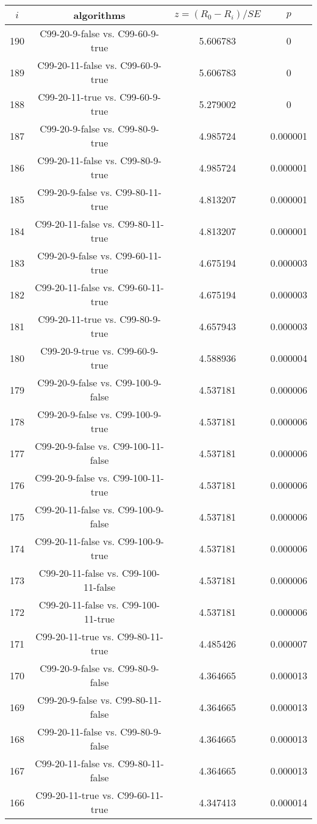 \documentclass[a4paper,10pt]{article}
\begin{document}
\begin{landscape}
\begin{table}[!htp]
\centering\scriptsize
\begin{tabular}{cccc}
$i$&algorithms&$z=(R_0 - R_i)/SE$&$p$\\
\hline190&C99-20-9-false vs. C99-60-9-true&5.606783&0\\
189&C99-20-11-false vs. C99-60-9-true&5.606783&0\\
188&C99-20-11-true vs. C99-60-9-true&5.279002&0\\
187&C99-20-9-false vs. C99-80-9-true&4.985724&0.000001\\
186&C99-20-11-false vs. C99-80-9-true&4.985724&0.000001\\
185&C99-20-9-false vs. C99-80-11-true&4.813207&0.000001\\
184&C99-20-11-false vs. C99-80-11-true&4.813207&0.000001\\
183&C99-20-9-false vs. C99-60-11-true&4.675194&0.000003\\
182&C99-20-11-false vs. C99-60-11-true&4.675194&0.000003\\
181&C99-20-11-true vs. C99-80-9-true&4.657943&0.000003\\
180&C99-20-9-true vs. C99-60-9-true&4.588936&0.000004\\
179&C99-20-9-false vs. C99-100-9-false&4.537181&0.000006\\
178&C99-20-9-false vs. C99-100-9-true&4.537181&0.000006\\
177&C99-20-9-false vs. C99-100-11-false&4.537181&0.000006\\
176&C99-20-9-false vs. C99-100-11-true&4.537181&0.000006\\
175&C99-20-11-false vs. C99-100-9-false&4.537181&0.000006\\
174&C99-20-11-false vs. C99-100-9-true&4.537181&0.000006\\
173&C99-20-11-false vs. C99-100-11-false&4.537181&0.000006\\
172&C99-20-11-false vs. C99-100-11-true&4.537181&0.000006\\
171&C99-20-11-true vs. C99-80-11-true&4.485426&0.000007\\
170&C99-20-9-false vs. C99-80-9-false&4.364665&0.000013\\
169&C99-20-9-false vs. C99-80-11-false&4.364665&0.000013\\
168&C99-20-11-false vs. C99-80-9-false&4.364665&0.000013\\
167&C99-20-11-false vs. C99-80-11-false&4.364665&0.000013\\
166&C99-20-11-true vs. C99-60-11-true&4.347413&0.000014\\

\end{tabular}
\end{table}
\end{landscape}
\end{document}
